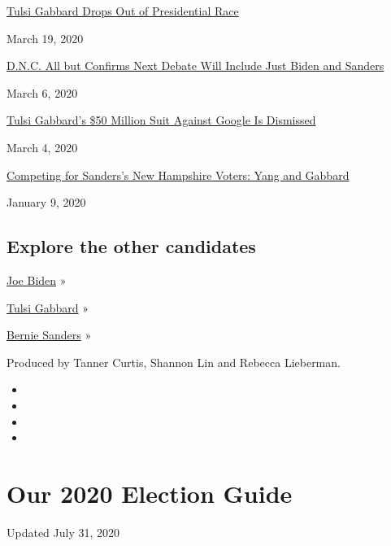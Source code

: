 \href{https://www.nytimes.com/2020/03/19/us/politics/tulsi-gabbard-drops-out.html}{Tulsi
Gabbard Drops Out of Presidential Race}

March 19, 2020

\href{https://www.nytimes.com/2020/03/06/us/politics/next-democratic-debate-biden-sanders.html}{D.N.C.
All but Confirms Next Debate Will Include Just Biden and Sanders}

March 6, 2020

\href{https://www.nytimes.com/2020/03/04/technology/google-tulsi-gabbard-lawsuit.html}{Tulsi
Gabbard's \$50 Million Suit Against Google Is Dismissed}

March 4, 2020

\href{https://www.nytimes.com/2020/01/09/us/politics/bernie-sanders-andrew-yang-tulsi-gabbard.html}{Competing
for Sanders's New Hampshire Voters: Yang and Gabbard}

January 9, 2020

\hypertarget{explore-the-other-candidates}{%
\subsection{Explore the other
candidates}\label{explore-the-other-candidates}}

\href{https://www.nytimes.com/interactive/2020/us/elections/joe-biden.html}{Joe
Biden} »

\href{https://www.nytimes.com/interactive/2020/us/elections/tulsi-gabbard.html}{Tulsi
Gabbard} »

\href{https://www.nytimes.com/interactive/2020/us/elections/bernie-sanders.html}{Bernie
Sanders} »

Produced by Tanner Curtis, Shannon Lin and Rebecca Lieberman.

\begin{itemize}
\item
\item
\item
\item
\end{itemize}

\hypertarget{our-2020-election-guide}{%
\section{Our 2020 Election Guide}\label{our-2020-election-guide}}

Updated July 31, 2020


